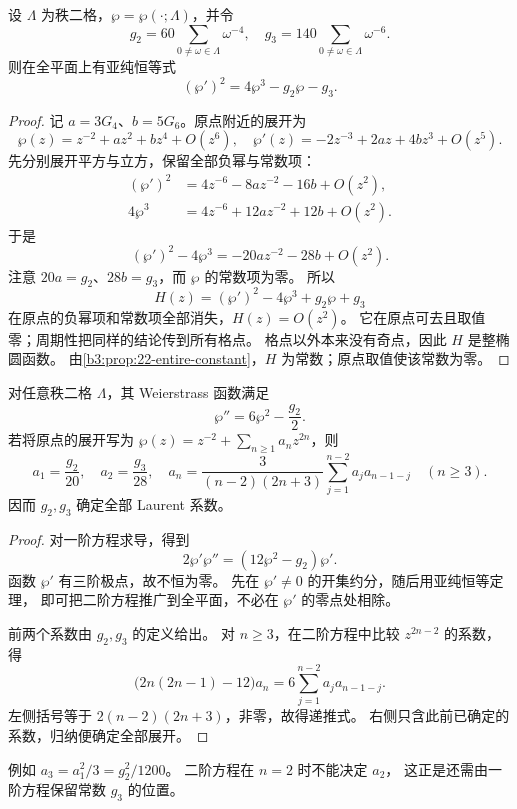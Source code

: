\begin{theorem}\label{b3:thm:22-wp-equation}
设 \(\Lambda\) 为秩二格，\(\wp=\wp(\cdot;\Lambda)\)，并令
\[
 g_2=60\sum_{0\ne\omega\in\Lambda}\omega^{-4},\quad
 g_3=140\sum_{0\ne\omega\in\Lambda}\omega^{-6}.
\]
则在全平面上有亚纯恒等式
\[
 (\wp')^2=4\wp^3-g_2\wp-g_3.
\]
\end{theorem}
\begin{proof}
记 \(a=3G_4\)、\(b=5G_6\)。原点附近的展开为
\[
 \wp(z)=z^{-2}+az^2+bz^4+O(z^6),\quad
 \wp'(z)=-2z^{-3}+2az+4bz^3+O(z^5).
\]
先分别展开平方与立方，保留全部负幂与常数项：
\[
 \begin{aligned}
 (\wp')^2&=4z^{-6}-8az^{-2}-16b+O(z^2),\\
 4\wp^3&=4z^{-6}+12az^{-2}+12b+O(z^2).
 \end{aligned}
\]
于是
\[
 (\wp')^2-4\wp^3=-20az^{-2}-28b+O(z^2).
\]
注意 \(20a=g_2\)、\(28b=g_3\)，而 \(\wp\) 的常数项为零。
所以
\[
 H(z)=(\wp')^2-4\wp^3+g_2\wp+g_3
\]
在原点的负幂项和常数项全部消失，\(H(z)=O(z^2)\)。
它在原点可去且取值零；周期性把同样的结论传到所有格点。
格点以外本来没有奇点，因此 \(H\) 是整椭圆函数。
由\cref{b3:prop:22-entire-constant}，\(H\) 为常数；原点取值使该常数为零。
\end{proof}

\begin{corollary}[二阶方程与系数递推]\label{b3:cor:22-wp-second-derivative}
对任意秩二格 \(\Lambda\)，其 Weierstrass 函数满足
\[
 \wp''=6\wp^2-\frac{g_2}{2}.
\]
若将原点的展开写为
\(\wp(z)=z^{-2}+\sum_{n\ge1}a_nz^{2n}\)，则
\[
 a_1=\frac{g_2}{20},\quad a_2=\frac{g_3}{28},\quad
 a_n=\frac{3}{(n-2)(2n+3)}
       \sum_{j=1}^{n-2}a_j a_{n-1-j}\quad(n\ge3).
\]
因而 \(g_2,g_3\) 确定全部 Laurent 系数。
\end{corollary}
\begin{proof}
对一阶方程求导，得到
\[
 2\wp'\wp''=(12\wp^2-g_2)\wp'.
\]
函数 \(\wp'\) 有三阶极点，故不恒为零。
先在 \(\wp'\ne0\) 的开集约分，随后用亚纯恒等定理，
即可把二阶方程推广到全平面，不必在 \(\wp'\) 的零点处相除。

前两个系数由 \(g_2,g_3\) 的定义给出。
对 \(n\ge3\)，在二阶方程中比较 \(z^{2n-2}\) 的系数，得
\[
 \bigl(2n(2n-1)-12\bigr)a_n
 =6\sum_{j=1}^{n-2}a_j a_{n-1-j}.
\]
左侧括号等于 \(2(n-2)(2n+3)\)，非零，故得递推式。
右侧只含此前已确定的系数，归纳便确定全部展开。
\end{proof}

例如 \(a_3=a_1^2/3=g_2^2/1200\)。
二阶方程在 \(n=2\) 时不能决定 \(a_2\)，
这正是还需由一阶方程保留常数 \(g_3\) 的位置。

